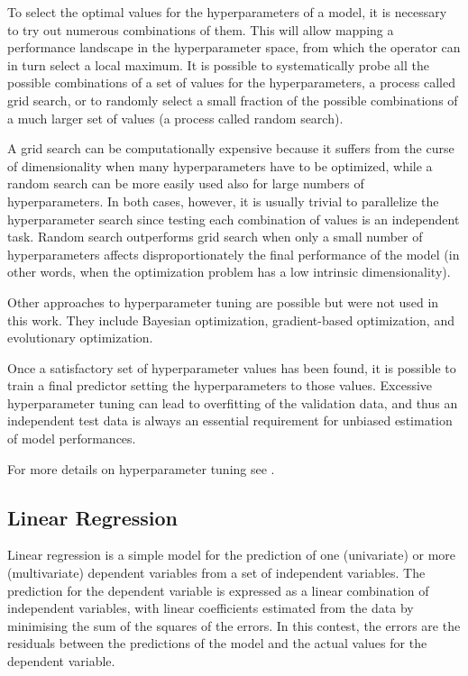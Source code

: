 To select the optimal values for the hyperparameters of a model, it is necessary to try out numerous combinations of them.
This will allow mapping a performance landscape in the hyperparameter space, from which the operator can in turn select a local maximum.
It is possible to systematically probe all the possible combinations of a set of values for the hyperparameters, a process called grid search, or to randomly select a small fraction of the possible combinations of a much larger set of values (a process called random search).

A grid search can be computationally expensive because it suffers from the curse of dimensionality when many hyperparameters have to be optimized, while a random search can be more easily used also for large numbers of hyperparameters.
In both cases, however, it is usually trivial to parallelize the hyperparameter search since testing each combination of values is an independent task.
Random search outperforms grid search when only a small number of hyperparameters affects disproportionately the final performance of the model (in other words, when the optimization problem has a low intrinsic dimensionality).

Other approaches to hyperparameter tuning are possible but were not used in this work.
They include Bayesian optimization, gradient-based optimization, and evolutionary optimization.

Once a satisfactory set of hyperparameter values has been found, it is possible to train a final predictor setting the hyperparameters to those values.
Excessive hyperparameter tuning can lead to overfitting of the validation data, and thus an independent test data is always an essential requirement for unbiased estimation of model performances.

For more details on hyperparameter tuning see \textcite{Bergstra2012, Claesen2015}.

\subsection{Linear Regression}
Linear regression is a simple model for the prediction of one (univariate) or more (multivariate) dependent variables from a set of independent variables.
The prediction for the dependent variable is expressed as a linear combination of independent variables, with linear coefficients estimated from the data by minimising the sum of the squares of the errors.
In this contest, the errors are the residuals between the predictions of the model and the actual values for the dependent variable.

